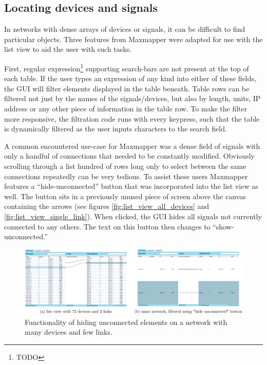 
	\subsection{Locating devices and signals} %
	\label{sub:locating_devices_and_signals}

In networks with dense arrays of devices or signals, it can be difficult to find particular objects. Three features from Maxmapper were adapted for use with the list view to aid the user with such tasks.

First, regular expression\footnote{TODO} supporting search-bars are not present at the top of each table. If the user types an expression of any kind into either of these fields, the GUI will filter elements displayed in the table beneath. Table rows can be filtered not just by the names of the signals/devices, but also by length, units, IP address or any other piece of information in the table row. To make the filter more responsive, the filtration code runs with every keypress, such that the table is dynamically filtered as the user inputs characters to the search field. 

A common encountered use-case for Maxmapper was a dense field of signals with only a handful of connections that needed to be constantly modified. Obviously scrolling through a list hundred of rows long only to select between the same connections repeatedly can be very tedious. To assist these users Maxmapper features a ``hide-unconnected'' button that was incorporated into the list view as well. The button sits in a previously unused piece of screen above the canvas containing the arrows (see figures \ref{fig:list_view_all_devices} and \ref{fig:list_view_single_link}). When clicked, the GUI hides all signals not currently connected to any others. The text on this button then changes to ``show-unconnected.''

\begin{figure}
	\centering
	\includegraphics[width=1\textwidth]{figures/hide_unconnected}
\caption{Functionality of hiding unconnected elements on a network with many devices and few links.}
\label{fig:hide_unconnected}
\end{figure}

